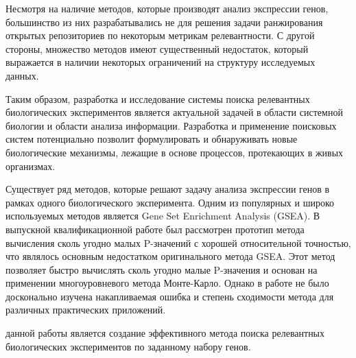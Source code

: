 Несмотря на наличие методов, которые производят анализ экспрессии генов, большинство из них разрабатывались не для решения задачи ранжирования открытых репозиториев по некоторым метрикам релевантности.
С другой стороны, множество методов имеют существенный недостаток, который выражается в наличии некоторых ограничений на структуру исследуемых данных.

Таким образом, разработка и исследование системы поиска релевантных биологических экспериментов является актуальной задачей в области системной биологии и области анализа информации. 
Разработка и применение поисковых систем потенциально позволит формулировать и обнаруживать новые биологические механизмы, лежащие в основе процессов, протекающих в живых организмах.




{\progress} Существует ряд методов, которые решают задачу анализа экспрессии генов в рамках одного биологического эксперимента.
Одним из популярных и широко используемых методов является Gene Set Enrichment Analysis (GSEA).
В выпускной квалификационной работе \cite{KorotkevichVKR} был рассмотрен прототип метода вычисления сколь угодно малых P-значений с хорошей относительной точностью, что являлось основным недостатком оригинального метода GSEA.
Этот метод позволяет быстро вычислять сколь угодно малые P-значения и основан на применении многоуровневого метода Монте-Карло.
Однако в работе не было досконально изучена накапливаемая ошибка и степень сходимости метода для различных практических приложений.

{\aim} данной работы является создание эффективного метода поиска релевантных биологических экспериментов по заданному набору генов.


